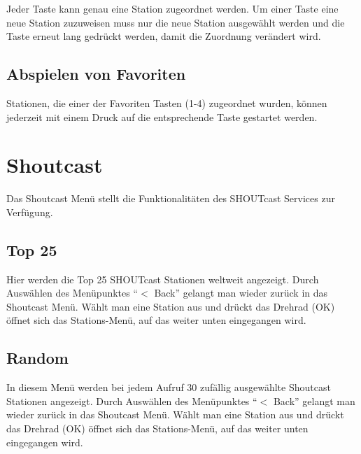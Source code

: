 \documentclass[12pt,a4paper,openany]{memoir}
\begin{document}
Jeder Taste kann genau eine Station zugeordnet werden. Um einer Taste eine neue Station zuzuweisen muss nur die neue Station ausgewählt werden und die Taste erneut lang gedrückt werden, damit die 
Zuordnung verändert wird. 

\subsection{Abspielen von Favoriten}
Stationen, die einer der Favoriten Tasten (1-4) zugeordnet wurden, können jederzeit mit einem Druck auf die entsprechende Taste gestartet werden. 



\section{Shoutcast}
Das Shoutcast Menü stellt die Funktionalitäten des SHOUTcast Services zur Verfügung. 


\subsection{Top 25}
Hier werden die Top 25 SHOUTcast Stationen weltweit angezeigt. Durch Auswählen des Menüpunktes ``$<$ Back'' gelangt man wieder zurück in das Shoutcast Menü. Wählt man eine Station aus und drückt das Drehrad (OK) 
öffnet sich das Stations-Menü, auf das weiter unten eingegangen wird. 



\subsection{Random}
In diesem Menü werden bei jedem Aufruf 30 zufällig ausgewählte Shoutcast Stationen angezeigt. Durch Auswählen des Menüpunktes ``$<$ Back'' gelangt man wieder zurück in das Shoutcast Menü. Wählt man eine Station aus und drückt das Drehrad (OK) 
öffnet sich das Stations-Menü, auf das weiter unten eingegangen wird. 
\end{document}
